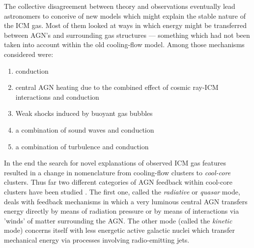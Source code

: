 \documentclass[twoside,single]{lion-msc}
\begin{document}
    The collective disagreement between theory and observations eventually lead astronomers to conceive of new models which might explain the stable nature of the ICM gas. Most of them looked at ways in which energy might be transferred between AGN's and surrounding gas structures --- something which had not been taken into account within the old cooling-flow model. Among those mechanisms considered were:

    \begin{enumerate}
            \item conduction \citep{Zakamska2002}
            \item central AGN heating due to the combined effect of cosmic ray-ICM interactions and conduction \citep{Guo2007}
            \item Weak shocks induced by buoyant gas bubbles \citep{Mathews2005}
            \item a combination of sound waves and conduction\citep{Ruszkowski2003}
            \item a combination of turbulence and conduction\citep{Dennis2006}
        \end{enumerate}
    
    In the end the search for novel explanations of observed ICM gas features resulted in a change in nomenclature from cooling-flow clusters to \textit{cool-core} clusters. Thus far two different categories of AGN feedback within cool-core clusters have been studied \citep{Fabian2012}. The first one, called the \textit{radiative} or \textit{quasar} mode, deals with feedback mechanisms in which a very luminous central AGN transfers energy directly by means of radiation pressure or by means of interactions via 'winds' of matter surrounding the AGN. The other mode (called the \textit{kinetic} mode) concerns itself with less energetic active galactic nuclei which transfer mechanical energy via processes involving radio-emitting jets. \\ 
    
\end{document}
